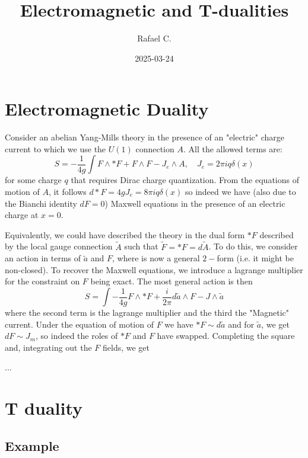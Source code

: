 \documentclass[10pt,
 article,
 amsmath,amssymb
]{revtex4-2}
\begin{document}
\title{Electromagnetic and T-dualities}



\author{Rafael C.}




\date{2025-03-24}







\maketitle

\tableofcontents




\section{Electromagnetic Duality}
Consider an abelian Yang-Mills theory in the presence of an "electric" charge current to which we use the $U(1)$ connection $A$. All the allowed terms are:
\begin{equation}
    S=-\frac{1}{4g}\int F \wedge * F + F \wedge F - J_e \wedge A, \quad J_e= 2\pi i q \delta(x) 
\end{equation}
for some charge $q$ that requires Dirac charge quantization. From the equations of motion of $A$, it follows $d*F=4g J_e= 8 \pi i q \delta(x)$ so indeed
we have (also due to the Bianchi identity $dF=0$) Maxwell equations in the presence of an electric charge at $x=0$. 

Equivalently, we could have described the theory in the dual form $*F$ 
described by the local gauge connection $\tilde{A}$ such that $\tilde{F}=*F= d\tilde{A}$. To do this, we consider an action in terms of $\tilde{a}$
and $F$, where is now a general $2-$form (i.e. it might be non-closed). To recover the Maxwell equations, we introduce a lagrange multiplier for the 
constraint on $F$ being exact. The most general action is then
\begin{equation}
    S=\int -\frac{1}{4g} F \wedge * F + \frac{i}{2 \pi} d \tilde{a} \wedge F - J \wedge \tilde{a}
\end{equation}
where the second term is the lagrange multiplier and the third the "Magnetic" current. Under the equation of motion of $F$ we have $*F\sim d \tilde{a}$ 
and for $\tilde{a}$, we get $dF\sim J_m$, so indeed the roles of $*F$ and $F$ have swapped. Completing the square and, integrating out the $F$ fields, we get 

...

\section{T duality}

\subsection{Example}
\end{document}
